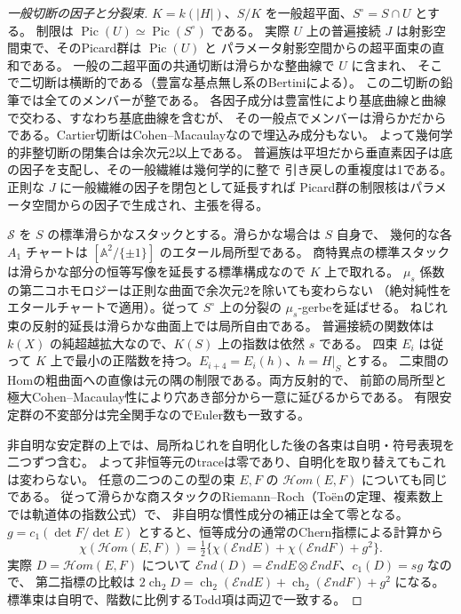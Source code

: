 \begin{proof}[一般切断の因子と分裂束]
$K=k(|H|)$、$S/K$ を一般超平面、$S^\circ=S\cap U$ とする。
制限は $\operatorname{Pic}(U)\simeq\operatorname{Pic}(S^\circ)$ である。
実際 $U$ 上の普遍接続 $J$ は射影空間束で、そのPicard群は $\operatorname{Pic}(U)$ と
パラメータ射影空間からの超平面束の直和である。
一般の二超平面の共通切断は滑らかな整曲線で $U$ に含まれ、
そこで二切断は横断的である（豊富な基点無し系のBertiniによる）。
この二切断の鉛筆では全てのメンバーが整である。
各因子成分は豊富性により基底曲線と曲線で交わる、すなわち基底曲線を含むが、
その一般点でメンバーは滑らかだからである。Cartier切断はCohen--Macaulayなので埋込み成分もない。
よって幾何学的非整切断の閉集合は余次元2以上である。
普遍族は平坦だから垂直素因子は底の因子を支配し、その一般繊維は幾何学的に整で
引き戻しの重複度は1である。正則な $J$ に一般繊維の因子を閉包として延長すれば
Picard群の制限核はパラメータ空間からの因子で生成され、主張を得る。

$\mathcal S$ を $S$ の標準滑らかなスタックとする。滑らかな場合は $S$ 自身で、
幾何的な各 $A_1$ チャートは $[\mathbb A^2/\{\pm1\}]$ のエタール局所型である。
商特異点の標準スタックは滑らかな部分の恒等写像を延長する標準構成なので $K$ 上で取れる。
$\mu_s$ 係数の第二コホモロジーは正則な曲面で余次元2を除いても変わらない
（絶対純性をエタールチャートで適用）。従って $S^\circ$ 上の分裂の $\mu_s$-gerbeを延ばせる。
ねじれ束の反射的延長は滑らかな曲面上では局所自由である。
普遍接続の関数体は $k(X)$ の純超越拡大なので、$K(S)$ 上の指数は依然 $s$ である。
四束 $E_i$ は従って $K$ 上で最小の正階数を持つ。$E_{i+4}=E_i(h)$、$h=H|_S$ とする。
二束間のHomの粗曲面への直像は元の隅の制限である。両方反射的で、
前節の局所型と極大Cohen--Macaulay性により穴あき部分から一意に延びるからである。
有限安定群の不変部分は完全関手なのでEuler数も一致する。

非自明な安定群の上では、局所ねじれを自明化した後の各束は自明・符号表現を二つずつ含む。
よって非恒等元のtraceは零であり、自明化を取り替えてもこれは変わらない。
任意の二つのこの型の束 $E,F$ の $\mathcal Hom(E,F)$ についても同じである。
従って滑らかな商スタックのRiemann--Roch（To\"enの定理、複素数上では軌道体の指数公式）で、
非自明な慣性成分の補正は全て零となる。
$g=c_1(\det F/\det E)$ とすると、恒等成分の通常のChern指標による計算から
\[
 \chi(\mathcal Hom(E,F))
 =\tfrac12\{\chi(\mathcal End E)+\chi(\mathcal End F)+g^2\}.
\]
実際 $D=\mathcal Hom(E,F)$ について
$\mathcal End(D)=\mathcal End E\otimes\mathcal End F$、$c_1(D)=s g$ なので、
第二指標の比較は $2\operatorname{ch}_2D=
\operatorname{ch}_2(\mathcal End E)+\operatorname{ch}_2(\mathcal End F)+g^2$ になる。
標準束は自明で、階数に比例するTodd項は両辺で一致する。


\end{proof}
